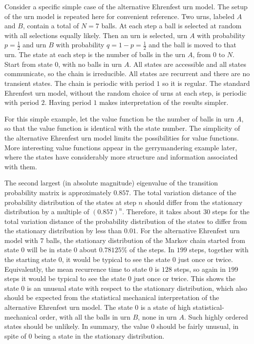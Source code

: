 \documentclass[12pt]{article}
\begin{document}
\begin{example}
    Consider a specific simple case of the alternative Ehrenfest urn
    model.%
    The setup of the urn model is repeated here for convenient
    reference. Two urns, labeled \( A \) and \( B \), contain a total of
    \( N = 7 \) balls.  At each step a ball is selected at random with
    all selections equally likely.  Then an urn is selected, urn \( A \)
    with probability \( p = \frac{1}{2} \) and urn \( B \) with
    probability \( q = 1-p = \frac {1}{2} \) and the ball is moved to
    that urn.  The state at each step is the number of balls in the urn \(
    A \), from \( 0 \) to \( N \).  Start from state \( 0 \), with no
    balls in urn \( A \).  All states are accessible and all states
    communicate, so the chain is irreducible.  All states are recurrent
    and there are no transient states.  The chain is periodic with
    period \( 1 \) so it is regular.  The standard Ehrenfest urn model,
    without the random choice of urns at each step, is periodic with
    period \( 2 \).  Having period \( 1 \) makes interpretation of the
    results simpler.

    For this simple example, let the value function be the number of
    balls in urn \( A \), so that the value function is identical with
    the state number.  The simplicity of the alternative Ehrenfest urn
    model limits the possibilities for value functions.  More
    interesting value functions appear in the gerrymandering example
    later, where the states have considerably more structure and
    information associated with them.

    The second largest (in absolute magnitude) eigenvalue of the
    transition probability matrix is approximately \( 0.857 \).  The
    total variation distance of the probability distribution of the
    states at step \( n \) should differ from the stationary
    distribution by a multiple of \( (0.857)^n \).  Therefore, it takes
    about \( 30 \) steps for the total variation distance of the
    probability distribution of the states to differ from the stationary
    distribution by less than \( 0.01 \).  For the alternative Ehrenfest
    urn model with \( 7 \) balls, the stationary distribution of the
    Markov chain started from state \( 0 \) will be in state \( 0 \)
    about \( 0.78125\% \) of the steps.  In \( 199 \) steps, together
    with the starting state \( 0 \), it would be typical to see the
    state \( 0 \) just once or twice.  Equivalently, the mean recurrence
    time to state \( 0 \) is \( 128 \) steps, so again in \( 199 \)
    steps it would be typical to see the state \( 0 \) just once or
    twice.  This shows the state \( 0 \) is an unusual state with
    respect to the stationary distribution, which also should be
    expected from the statistical mechanical interpretation of the
    alternative Ehrenfest urn model.  The state \( 0 \) is a state of
    high statistical-mechanical order, with all the balls in urn \( B \),
    none in urn \( A \).  Such highly ordered states should be unlikely.
    In summary, the value \( 0 \) should be fairly unusual, in spite of \(
    0 \) being a state in the stationary distribution.


\end{example}
\end{document}

